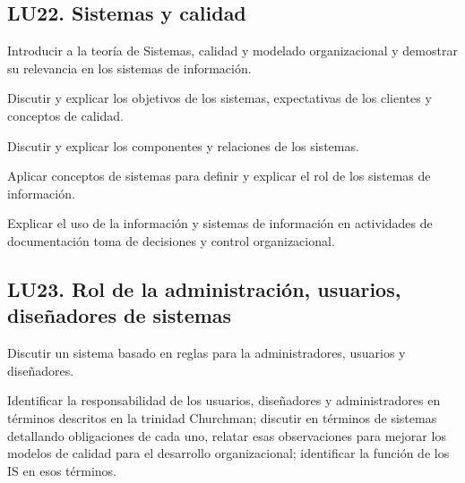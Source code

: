 \subsection{LU22. Sistemas y calidad}\label{sec:LU22}
\begin{LearningUnit}
\begin{LUGoal}
\item Introducir a la teoría de Sistemas, calidad  y modelado organizacional y demostrar su relevancia en los sistemas de información.
\end{LUGoal}

\begin{LUObjective}
\item Discutir y explicar los objetivos de los sistemas, expectativas de los clientes y conceptos de calidad.
\item Discutir y explicar los componentes y relaciones de los sistemas.
\item Aplicar conceptos de sistemas para definir y explicar el rol de los sistemas de información.
\item Explicar el uso de la información y sistemas de información en actividades de documentación toma de decisiones y control organizacional.
\end{LUObjective}
\end{LearningUnit}

\subsection{LU23. Rol de la administración, usuarios, diseñadores de sistemas}\label{sec:LU23}
\begin{LearningUnit}
\begin{LUGoal}
\item Discutir un sistema basado en reglas para la administradores, usuarios y diseñadores.
\end{LUGoal}

\begin{LUObjective}
\item Identificar la responsabilidad de los usuarios, diseñadores y administradores en términos descritos en la trinidad Churchman;  discutir en términos de sistemas detallando obligaciones de cada uno, relatar esas observaciones para mejorar los modelos de calidad para el desarrollo organizacional; identificar la función de los  IS en esos términos.
\end{LUObjective}
\end{LearningUnit}

